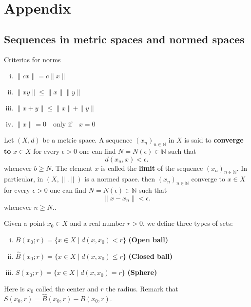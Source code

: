 \documentclass{article}
\theoremstyle{remark}
\begin{document}
\newpage
\section{Appendix}%
\label{sec:Notes}

\subsection{Sequences in metric spaces and normed spaces}%
\label{sub:sequences_in_metric_spaces_and_normed_spaces}

\begin{definition}[Norm]
  Criterias for norms
  \begin{enumerate}[(i)]
    \item $\|cx\| = c\|x\|$
    \item $\|xy\| \le \|x\| \|y\|$
    \item $\|x + y\| \le \|x\| +  \|y\|$
    \item $\|x\| = 0 \quad \text{only if} \quad x = 0 $ 
  \end{enumerate}

\end{definition}


\begin{definition}[Sequence]
  Let $\left( X,d \right) $ be a metric space. A sequence $\left( x_{n} \right) _{n \in \mathbb{N}}$ in $X$ is said to \textbf{converge to} $x \in X$ for every $\epsilon > 0$ one can find $N=N(\epsilon) \in \mathbb{N}$ such that \[
    d\left( x_n, x \right) <  \epsilon 
  .\] whenever $b \ge N$. The element $x$ is called the \textbf{limit} of the sequence $\left( x_{n} \right) _{n \in \mathbb{N}}$. In particular, in $\left( X,\|.\| \right) $ is a normed space. then $\left( x_{n} \right) _{n \in \mathbb{N}}$ converge to $x \in X$ for every $\epsilon > 0$ one can find $N = N\left( \epsilon \right) \in \mathbb{N}$ such that \[
  \|x - x_{n} \| < \epsilon
  .\] whenever $n \ge N$..
\end{definition}

\begin{definition}
  Given a point $x_0 \in X$ and a real number $r>0$, we define three types of sets:
  \begin{enumerate}[(i)]
    \item $B\left( x_0; r \right)  = \{x\in X  \mid d\left( x,x_0 \right) < r\} $ \textbf{(Open ball)} 
    \item $\hat{B}\left( x_0; r \right)  = \{x\in X  \mid d\left( x,x_0 \right) \le r \} $ \textbf{(Closed ball)} 
    \item $S\left( x_0; r \right)  = \{x\in X  \mid d\left( x,x_0 \right) = r\} $ \textbf{(Sphere)} 
  \end{enumerate}

  Here is $x_0$ called the center and $r$ the radius. Remark that $S\left( x_0, r \right)  = \hat{B}\left( x_0,r \right) - B\left( x_0,r \right) $.
\end{definition}
\end{document}
